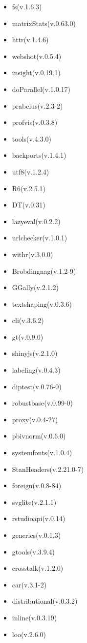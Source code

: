 \documentclass[
]{article}
\providecommand{\tightlist}{%
  \setlength{\itemsep}{0pt}\setlength{\parskip}{0pt}}
\begin{document}
\begin{itemize}
\tightlist
\item
  fs(v.1.6.3)
\item
  matrixStats(v.0.63.0)
\item
  httr(v.1.4.6)
\item
  webshot(v.0.5.4)
\item
  insight(v.0.19.1)
\item
  doParallel(v.1.0.17)
\item
  prabclus(v.2.3-2)
\item
  profvis(v.0.3.8)
\item
  tools(v.4.3.0)
\item
  backports(v.1.4.1)
\item
  utf8(v.1.2.4)
\item
  R6(v.2.5.1)
\item
  DT(v.0.31)
\item
  lazyeval(v.0.2.2)
\item
  urlchecker(v.1.0.1)
\item
  withr(v.3.0.0)
\item
  Brobdingnag(v.1.2-9)
\item
  GGally(v.2.1.2)
\item
  textshaping(v.0.3.6)
\item
  cli(v.3.6.2)
\item
  gt(v.0.9.0)
\item
  shinyjs(v.2.1.0)
\item
  labeling(v.0.4.3)
\item
  diptest(v.0.76-0)
\item
  robustbase(v.0.99-0)
\item
  proxy(v.0.4-27)
\item
  pbivnorm(v.0.6.0)
\item
  systemfonts(v.1.0.4)
\item
  StanHeaders(v.2.21.0-7)
\item
  foreign(v.0.8-84)
\item
  svglite(v.2.1.1)
\item
  rstudioapi(v.0.14)
\item
  generics(v.0.1.3)
\item
  gtools(v.3.9.4)
\item
  crosstalk(v.1.2.0)
\item
  car(v.3.1-2)
\item
  distributional(v.0.3.2)
\item
  inline(v.0.3.19)
\item
  loo(v.2.6.0)

\end{itemize}
\end{document}
